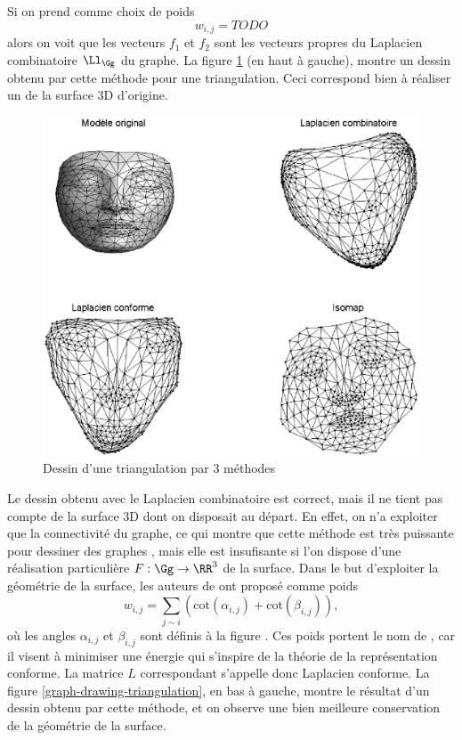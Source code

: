 \paraspace
Si on prend comme choix de poids
\begin{equation*}
w_{i,j} = TODO
\end{equation*}
alors on voit que les vecteurs $f_1$ et $f_2$ sont les vecteurs propres du Laplacien combinatoire $\Ll_\Gg$ du graphe. La figure \ref{fig-graph-drawing-triangulation} (en haut à gauche), montre un dessin obtenu par cette méthode pour une triangulation. Ceci correspond bien à réaliser un  de la surface 3D d'origine.\begin{figure}[ht] 
    \begin{center}
    \includegraphics[scale=0.6]{images/graph-drawing-triangulation.eps}
    \end{center}
    \caption{Dessin d'une triangulation par 3 méthodes}
	 \label{fig-graph-drawing-triangulation}
\end{figure}


\paraspace
Le dessin obtenu avec le Laplacien combinatoire est correct, mais il ne tient pas compte de la surface 3D dont on disposait au départ. En effet, on n'a exploiter que la connectivité du graphe, ce qui montre que cette méthode est très puissante pour dessiner des graphes , mais elle est insufisante si l'on dispose d'une réalisation particulière $F : \Gg \rightarrow \RR^3$ de la surface. Dans le but d'exploiter la géométrie de la surface, les auteurs de \cite{alliez-parameterization} ont proposé comme poids
\begin{equation*}
w_{i,j} = \sum_{ j \sim i }{ \left( \text{cot}(\alpha_{i,j})+\text{cot}(\beta_{i,j}) \right) },
\end{equation*}
où les angles $\alpha_{i,j}$ et $\beta_{i,j}$ sont définis à la figure \figref{}. Ces poids portent le nom de , car il visent à minimiser une énergie qui s'inspire de la théorie de la représentation conforme. La matrice $L$ correspondant s'appelle donc Laplacien conforme. La figure \ref{graph-drawing-triangulation}, en bas à gauche, montre le résultat d'un dessin obtenu par cette méthode, et on observe une bien meilleure conservation de la géométrie de la surface.

